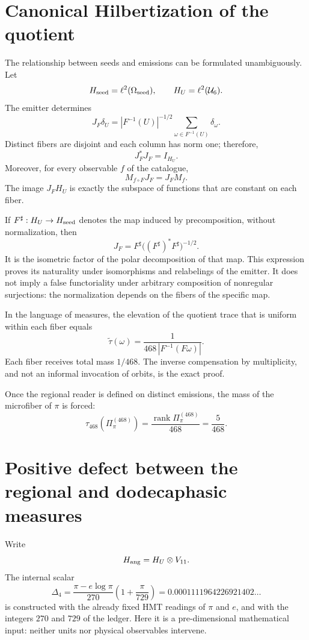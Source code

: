 \section{Canonical Hilbertization of the quotient}

The relationship between seeds and emissions can be formulated unambiguously.
Let
\[
 H_{\rm seed}=\ell^2(\Omega_{\rm seed}),
 \qquad
 H_U=\ell^2(\mathcal U_6).
\]
The emitter determines
\[
 \boxed{
 J_F\delta_U
 =|F^{-1}(U)|^{-1/2}
 \sum_{\omega\in F^{-1}(U)}\delta_\omega.
 }
\]
Distinct fibers are disjoint and each column has norm one; therefore,
\[
 J_F^*J_F=I_{H_U}.
\]
Moreover, for every observable \(f\) of the catalogue,
\[
 M_{f\circ F}J_F=J_FM_f.
\]
The image \(J_FH_U\) is exactly the subspace of functions that are constant
on each fiber.

If \(F^\sharp:H_U\to H_{\rm seed}\) denotes the map induced by
precomposition, without normalization,
then
\[
 J_F
 =F^\sharp\bigl((F^\sharp)^*F^\sharp\bigr)^{-1/2}.
\]
It is the isometric factor of the polar decomposition of that map. This
expression proves its naturality under isomorphisms and relabelings of the
emitter. It does not imply a false functoriality under arbitrary composition of
nonregular surjections: the normalization depends on the fibers of the
specific map.

In the language of measures, the elevation of the quotient trace that is
uniform within each fiber equals
\[
 \widetilde\tau(\omega)
 =\frac1{468\,|F^{-1}(F\omega)|}.
\]
Each fiber receives total mass \(1/468\). The inverse compensation by
multiplicity, and not an informal invocation of orbits, is the exact proof.

\begin{corollary}[Canonicity of \(5/468\)]
\label{p3-20260826:cor:canonicidad-cinco-468}
Once the regional reader is defined on distinct emissions, the mass
of the microfiber of \(\pi\) is forced:
\[
 \tau_{468}(\Pi_\pi^{(468)})
 =\frac{\operatorname{rank}\Pi_\pi^{(468)}}{468}
 =\frac5{468}.
\]
\end{corollary}

\section{Positive defect between the regional and dodecaphasic measures}

Write
\[
 H_{\rm ang}=H_U\otimes V_{11}.
\]
The internal scalar
\[
 \Delta_4
 =\frac{\pi-e\log\pi}{270}
 \left(1+\frac\pi{729}\right)
 =0.0001111964226921402\ldots
\]
is constructed with the already fixed HMT readings of \(\pi\) and \(e\), and with the
integers \(270\) and \(729\) of the ledger. Here it is a pre-dimensional
mathematical input: neither units nor physical observables intervene.

